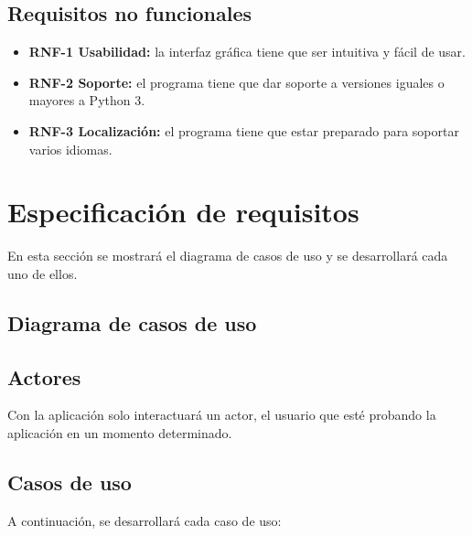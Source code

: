\subsection{Requisitos no funcionales}
\begin{itemize}
\tightlist
\item \textbf{RNF-1 Usabilidad:} la interfaz gráfica tiene que ser intuitiva y fácil de usar.
\item \textbf{RNF-2 Soporte:} el programa tiene que dar soporte a versiones iguales o mayores a Python 3.
\item \textbf{RNF-3 Localización:} el programa tiene que estar preparado para soportar varios idiomas.
\end{itemize}

\section{Especificación de requisitos}
En esta sección se mostrará el diagrama de casos de uso y se desarrollará cada uno de ellos.

\subsection{Diagrama de casos de uso}

\subsection{Actores}
Con la aplicación solo interactuará un actor, el usuario que esté probando la aplicación en un momento determinado.

\subsection{Casos de uso}
A continuación, se desarrollará cada caso de uso: